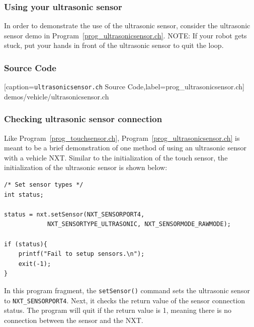 \documentclass[11pt]{article}
\begin{document}
\subsubsection{Using your ultrasonic sensor \label{sec:use_ultrasonic}}
In order to demonstrate the use of the ultrasonic sensor, consider the ultrasonic 
sensor demo in Program~\ref{prog_ultrasonicsensor.ch}. NOTE: If your robot gets 
stuck, put your hands in front of the ultrasonic sensor to quit the loop.

\subsubsection*{Source Code}

[caption={{\tt ultrasonicsensor.ch} Source Code},label=prog_ultrasonicsensor.ch]
{demos/vehicle/ultrasonicsensor.ch}

\subsubsection*{Checking ultrasonic sensor connection}
Like Program~\ref{prog_touchsensor.ch}, Program~\ref{prog_ultrasonicsensor.ch} 
is meant to be a brief demonstration of one method of using an ultrasonic sensor 
with a vehicle NXT. Similar to the initialization of the touch sensor, the 
initialization of the ultrasonic sensor is shown below:
\begin{lstlisting}
/* Set sensor types */
int status;

status = nxt.setSensor(NXT_SENSORPORT4, 
            NXT_SENSORTYPE_ULTRASONIC, NXT_SENSORMODE_RAWMODE);

if (status){
    printf("Fail to setup sensors.\n");
    exit(-1);
}
\end{lstlisting}
In this program fragment, the {\tt setSensor()} command sets the ultrasonic 
sensor to {\tt NXT\_SENSORPORT4}. Next, it checks the return value of the sensor 
connection status. The program will quit if the return value is 1, meaning there 
is no connection between the sensor and the NXT.
\end{document}
